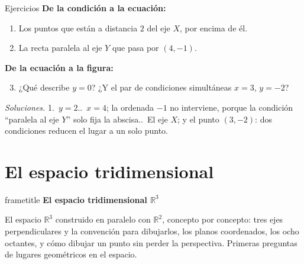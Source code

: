 \documentclass[aspectratio=169,10pt]{beamer}
\newcommand{\destaca}[1]{%
  \par\vspace{3pt}\noindent
  \colorbox{turquesaClaro}{%
    \parbox{\dimexpr\linewidth-2\fboxsep\relax}{\vspace{3pt}#1\vspace{3pt}}}%
  \par\vspace{3pt}}
\newcommand{\hojaSesion}[2]{%
  \vfill
  \begin{beamercolorbox}[wd=\textwidth,sep=16pt,center]{frametitle}
    {\Large\bfseries #1}\\[11pt]
    \begin{minipage}{0.82\textwidth}\centering\small #2\end{minipage}
  \end{beamercolorbox}
  \vfill}
\begin{document}
\begin{frame}{Ejercicios}
  \textbf{De la condición a la ecuación:}
  \begin{enumerate}
    \item Los puntos que están a distancia $2$ del eje $X$, por encima
      de él.
    \item La recta paralela al eje $Y$ que pasa por $(4,-1)$.
  \end{enumerate}

  \vspace{0.4cm}
  \textbf{De la ecuación a la figura:}
  \begin{enumerate}
    \setcounter{enumi}{2}
    \item ¿Qué describe $y=0$? ¿Y el par de condiciones simultáneas
      $x=3$, $y=-2$?
  \end{enumerate}
  
  \vspace{0.4cm}
  \destaca{\small \textit{Soluciones.} 1.~$y=2$..~$x=4$; la ordenada $-1$ no interviene, porque la condición
  ``paralela al eje $Y$'' solo fija la abscisa.\quad
  3.~El eje $X$; y el punto $(3,-2)$: dos condiciones reducen el lugar
  a un solo punto.}
\end{frame}

\section{El espacio tridimensional}
\begin{frame}[plain]
  \hojaSesion{El espacio tridimensional $\mathbb{R}^3$}{%
  El espacio $\mathbb{R}^3$ construido en paralelo con $\mathbb{R}^2$,
  concepto por concepto: tres ejes perpendiculares y la convención
  para dibujarlos, los planos coordenados, los ocho octantes, y cómo
  dibujar un punto sin perder la perspectiva. Primeras preguntas de
  lugares geométricos en el espacio.}
\end{frame}
\end{document}
